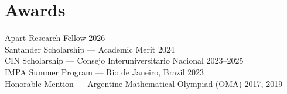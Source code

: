 \documentclass[11pt,a4paper]{article}
\begin{document}
\section{Awards}

Apart Research Fellow \hfill 2026\\
Santander Scholarship --- Academic Merit \hfill 2024\\
CIN Scholarship --- Consejo Interuniversitario Nacional \hfill 2023--2025\\
IMPA Summer Program --- Rio de Janeiro, Brazil \hfill 2023\\
Honorable Mention --- Argentine Mathematical Olympiad (OMA) \hfill 2017, 2019
\end{document}
